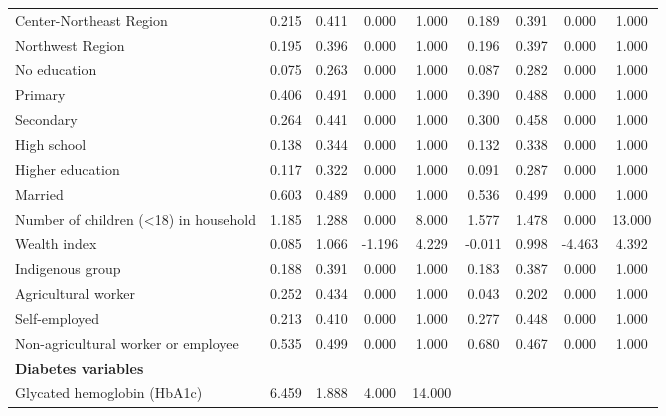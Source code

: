 \begin{table}[h!]
\begin{center}
{\begin{tabular}{l*{2}{cccc}}
Center-Northeast Region&       0.215&       0.411&       0.000&       1.000&       0.189&       0.391&       0.000&       1.000\\
Northwest Region    &       0.195&       0.396&       0.000&       1.000&       0.196&       0.397&       0.000&       1.000\\
No education        &       0.075&       0.263&       0.000&       1.000&       0.087&       0.282&       0.000&       1.000\\
Primary             &       0.406&       0.491&       0.000&       1.000&       0.390&       0.488&       0.000&       1.000\\
Secondary           &       0.264&       0.441&       0.000&       1.000&       0.300&       0.458&       0.000&       1.000\\
High school         &       0.138&       0.344&       0.000&       1.000&       0.132&       0.338&       0.000&       1.000\\
Higher education    &       0.117&       0.322&       0.000&       1.000&       0.091&       0.287&       0.000&       1.000\\
Married             &       0.603&       0.489&       0.000&       1.000&       0.536&       0.499&       0.000&       1.000\\
Number of children (<18) in household&       1.185&       1.288&       0.000&       8.000&       1.577&       1.478&       0.000&      13.000\\
Wealth index        &       0.085&       1.066&      -1.196&       4.229&      -0.011&       0.998&      -4.463&       4.392\\
Indigenous group    &       0.188&       0.391&       0.000&       1.000&       0.183&       0.387&       0.000&       1.000\\
Agricultural worker &       0.252&       0.434&       0.000&       1.000&       0.043&       0.202&       0.000&       1.000\\
Self-employed       &       0.213&       0.410&       0.000&       1.000&       0.277&       0.448&       0.000&       1.000\\
Non-agricultural worker or employee&       0.535&       0.499&       0.000&       1.000&       0.680&       0.467&       0.000&       1.000\\
\textbf{Diabetes variables} &&&&&&&& \\
Glycated hemoglobin (HbA1c)&       6.459&       1.888&       4.000&      14.000&            &            &            &            \\

\end{tabular}}
\end{center}
\end{table}
